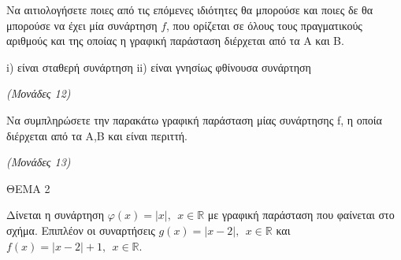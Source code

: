 \documentclass[11pt,a4paper,twoside]{book}
\newcommand{\monades}[1]{\hfill \textit{(Μονάδες #1)}}
\begin{document}
\begin{alist}
\item Να αιτιολογήσετε ποιες από τις επόμενες ιδιότητες θα μπορούσε και ποιες δε θα μπορούσε να έχει μία συνάρτηση $f$, που ορίζεται σε όλους τους πραγματικούς αριθμούς και της οποίας η γραφική παράσταση διέρχεται από τα Α και Β.

i) είναι σταθερή συνάρτηση ii) είναι γνησίως φθίνουσα συνάρτηση

\monades{12}

\item Να συμπληρώσετε την παρακάτω γραφική παράσταση μίας συνάρτησης f, η οποία διέρχεται από τα Α,Β και είναι περιττή.

\begin{center}
\end{center}

\monades{13}
\end{alist}

\vspace{4mm}

ΘΕΜΑ 2

Δίνεται η συνάρτηση $\varphi(x) = |x|,\ \ x \in \mathbb{R}$ με γραφική παράσταση που φαίνεται στο σχήμα. Επιπλέον οι συναρτήσεις $g(x) = |x - 2|,\ \ x \in \mathbb{R}$ και $f(x) = |x - 2| + 1,\ \ x\mathbb{\in R}$.
\end{document}
